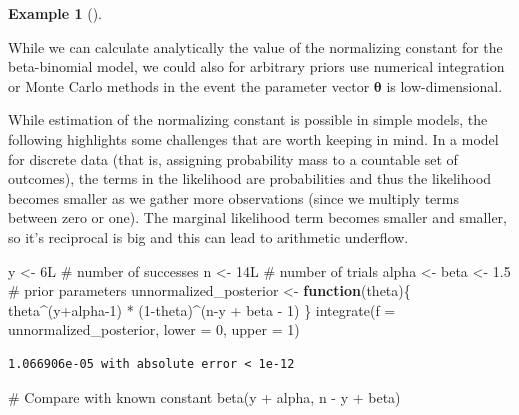 \documentclass[
  11pt,
  letterpaper,
]{scrbook}
\newenvironment{Shaded}{\begin{snugshade}}{\end{snugshade}}
\newcommand{\AttributeTok}[1]{\textcolor[rgb]{0.40,0.45,0.13}{#1}}
\newcommand{\CommentTok}[1]{\textcolor[rgb]{0.37,0.37,0.37}{#1}}
\newcommand{\ControlFlowTok}[1]{\textcolor[rgb]{0.00,0.23,0.31}{\textbf{#1}}}
\newcommand{\DecValTok}[1]{\textcolor[rgb]{0.68,0.00,0.00}{#1}}
\newcommand{\FloatTok}[1]{\textcolor[rgb]{0.68,0.00,0.00}{#1}}
\newcommand{\FunctionTok}[1]{\textcolor[rgb]{0.28,0.35,0.67}{#1}}
\newcommand{\NormalTok}[1]{\textcolor[rgb]{0.00,0.23,0.31}{#1}}
\newcommand{\OtherTok}[1]{\textcolor[rgb]{0.00,0.23,0.31}{#1}}
\newcommand{\SpecialCharTok}[1]{\textcolor[rgb]{0.37,0.37,0.37}{#1}}
\theoremstyle{definition}
\theoremstyle{plain}
\theoremstyle{plain}
\theoremstyle{definition}
\newtheorem{example}{Example}[chapter]
\theoremstyle{definition}
\theoremstyle{remark}
\begin{document}
\begin{example}[]\protect\hypertarget{exm-numericalintegration}{}\label{exm-numericalintegration}

While we can calculate analytically the value of the normalizing
constant for the beta-binomial model, we could also for arbitrary priors
use numerical integration or Monte Carlo methods in the event the
parameter vector \(\boldsymbol{\theta}\) is low-dimensional.

While estimation of the normalizing constant is possible in simple
models, the following highlights some challenges that are worth keeping
in mind. In a model for discrete data (that is, assigning probability
mass to a countable set of outcomes), the terms in the likelihood are
probabilities and thus the likelihood becomes smaller as we gather more
observations (since we multiply terms between zero or one). The marginal
likelihood term becomes smaller and smaller, so it's reciprocal is big
and this can lead to arithmetic underflow.

\begin{Shaded}
\begin{Highlighting}[]
\NormalTok{y }\OtherTok{\textless{}{-}} \DecValTok{6}\NormalTok{L }\CommentTok{\# number of successes }
\NormalTok{n }\OtherTok{\textless{}{-}} \DecValTok{14}\NormalTok{L }\CommentTok{\# number of trials}
\NormalTok{alpha }\OtherTok{\textless{}{-}}\NormalTok{ beta }\OtherTok{\textless{}{-}} \FloatTok{1.5} \CommentTok{\# prior parameters}
\NormalTok{unnormalized\_posterior }\OtherTok{\textless{}{-}} \ControlFlowTok{function}\NormalTok{(theta)\{}
\NormalTok{  theta}\SpecialCharTok{\^{}}\NormalTok{(y}\SpecialCharTok{+}\NormalTok{alpha}\DecValTok{{-}1}\NormalTok{) }\SpecialCharTok{*}\NormalTok{ (}\DecValTok{1}\SpecialCharTok{{-}}\NormalTok{theta)}\SpecialCharTok{\^{}}\NormalTok{(n}\SpecialCharTok{{-}}\NormalTok{y }\SpecialCharTok{+}\NormalTok{ beta }\SpecialCharTok{{-}} \DecValTok{1}\NormalTok{)}
\NormalTok{\}}
\FunctionTok{integrate}\NormalTok{(}\AttributeTok{f =}\NormalTok{ unnormalized\_posterior,}
          \AttributeTok{lower =} \DecValTok{0}\NormalTok{,}
          \AttributeTok{upper =} \DecValTok{1}\NormalTok{)}
\end{Highlighting}
\end{Shaded}

\begin{verbatim}
1.066906e-05 with absolute error < 1e-12
\end{verbatim}

\begin{Shaded}
\begin{Highlighting}[]
\CommentTok{\# Compare with known constant}
\FunctionTok{beta}\NormalTok{(y }\SpecialCharTok{+}\NormalTok{ alpha, n }\SpecialCharTok{{-}}\NormalTok{ y }\SpecialCharTok{+}\NormalTok{ beta)}
\end{Highlighting}
\end{Shaded}


\end{example}
\end{document}
